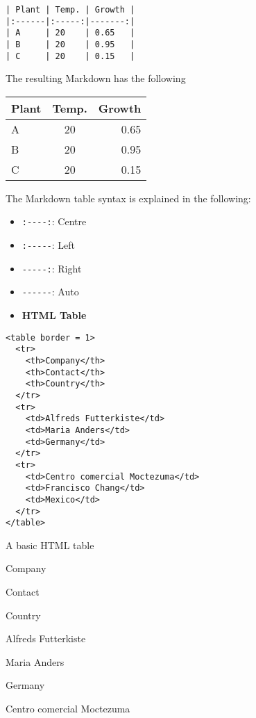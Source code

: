 \documentclass[
]{article}
\providecommand{\tightlist}{%
  \setlength{\itemsep}{0pt}\setlength{\parskip}{0pt}}
\begin{document}
\begin{verbatim}
| Plant | Temp. | Growth |
|:------|:-----:|-------:|
| A     | 20    | 0.65   |
| B     | 20    | 0.95   |
| C     | 20    | 0.15   |
\end{verbatim}

The resulting Markdown has the following

\begin{longtable}[]{@{}lcr@{}}
\toprule
Plant & Temp. & Growth \\
\midrule
\endhead
A & 20 & 0.65 \\
B & 20 & 0.95 \\
C & 20 & 0.15 \\
\bottomrule
\end{longtable}

The Markdown table syntax is explained in the following:

\begin{itemize}
\tightlist
\item
  \texttt{:-\/-\/-\/-:}: Centre
\item
  \texttt{:-\/-\/-\/-\/-}: Left
\item
  \texttt{-\/-\/-\/-\/-:}: Right
\item
  \texttt{-\/-\/-\/-\/-\/-}: Auto
\end{itemize}

\hfill\break

\hfill\break

\begin{itemize}
\tightlist
\item
  \textbf{HTML Table}
\end{itemize}

\begin{verbatim}
<table border = 1>
  <tr>
    <th>Company</th>
    <th>Contact</th>
    <th>Country</th>
  </tr>
  <tr>
    <td>Alfreds Futterkiste</td>
    <td>Maria Anders</td>
    <td>Germany</td>
  </tr>
  <tr>
    <td>Centro comercial Moctezuma</td>
    <td>Francisco Chang</td>
    <td>Mexico</td>
  </tr>
</table>
\end{verbatim}

A basic HTML table

Company

Contact

Country

Alfreds Futterkiste

Maria Anders

Germany

Centro comercial Moctezuma
\end{document}
